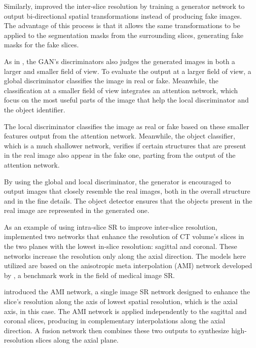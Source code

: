 \par
Similarly, \textcite{Wu2022} improved the inter-slice resolution by training a generator network to output bi-directional spatial transformations instead of producing fake images. The advantage of this process is that it allows the same transformations to be applied to the segmentation masks from the surrounding slices, generating fake masks for the fake slices. 
\par
As in \textcite{Xia2021}, the GAN's discriminators also judges the generated images in both a larger and smaller field of view. To evaluate the output at a larger field of view, a global discriminator classifies the image in real or fake. Meanwhile, the classification at a smaller field of view integrates an attention network, which focus on the most useful parts of the image that help the local discriminator and the object identifier. 
\par
The local discriminator classifies the image as real or fake based on these smaller features output from the attention network. Meanwhile, the object classifier, which is a much shallower network, verifies if certain structures that are present in the real image also appear in the fake one, parting from the output of the attention network. 
\par
By using the global and local discriminator, the generator is encouraged to output images that closely resemble the real images, both in the overall structure and in the fine details. The object detector ensures that the objects present in the real image are represented in the generated one.
\par
As an example of using intra-slice SR to improve inter-slice resolution, \textcite{Zhang2024} implemented two networks that enhance the resolution of CT volume's slices in the two planes with the lowest in-slice resolution: sagittal and coronal. These networks increase the resolution only along the axial direction. The models here utilized are based on the anisotropic meta interpolation (AMI) network developed by \textcite{Peng2020}, a benchmark work in the field of medical image SR. 
\par
\textcite{Peng2020} introduced the AMI network, a single image SR network designed to enhance the slice's resolution along the axis of lowest spatial resolution, which is the axial axis, in this case. The AMI network is applied independently to the sagittal and coronal slices, producing in complementary interpolations along the axial direction. A fusion network then combines these two outputs to synthesize high-resolution slices along the axial plane.
